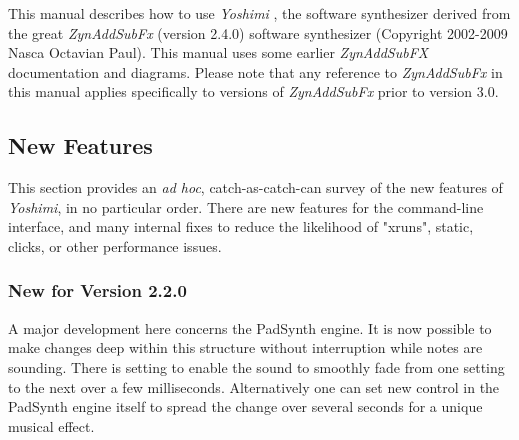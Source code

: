 \documentclass[
 11pt,
 twoside,
 a4paper,
 final                                 %
]{article}
\begin{document}
   This manual describes how to use \textsl{Yoshimi} \cite{yoshimi},
   the software synthesizer derived from the great
   \textsl{ZynAddSubFx} (version 2.4.0) \cite{zynaddsubfx} software
   synthesizer (Copyright 2002-2009 Nasca Octavian Paul).
   This manual uses some earlier \textsl{ZynAddSubFX} documentation and
   diagrams.  Please note that any reference to \textsl{ZynAddSubFx}
   in this manual applies specifically to versions of \textsl{ZynAddSubFx}
   prior to version 3.0.

%
%

\subsection{New Features}
\label{subsec:introduction_new_features}

   This section provides an \textsl{ad hoc}, catch-as-catch-can survey of the
   new features of \textsl{Yoshimi}, in no particular order.
   There are new features for the command-line interface, and many internal
   fixes to reduce the likelihood of "xruns", static, clicks, or other
   performance issues.

\subsubsection{New for Version 2.2.0}
\label{subsubsec:new_features_2_2_0}
   A major development here concerns the PadSynth engine. It is now
   possible to make changes deep within this structure without interruption
   while notes are sounding. There is setting to enable the sound to
   smoothly fade from one setting to the next over a few milliseconds.
   Alternatively one can set new control in the PadSynth engine itself to
   spread the change over several seconds for a unique musical effect.
\end{document}
